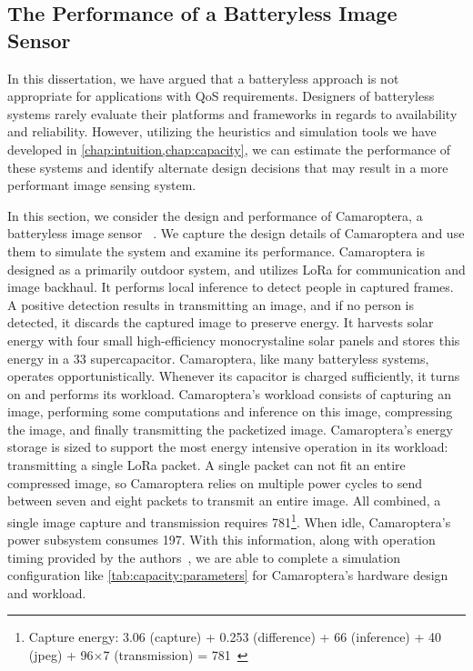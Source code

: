 \subsection{The Performance of a Batteryless Image Sensor}
In this dissertation, we have argued that a batteryless approach is not appropriate for applications with QoS requirements. Designers of batteryless systems rarely evaluate their platforms and frameworks in regards to availability and reliability. However, utilizing the heuristics and simulation tools we have developed in \cref{chap:intuition,chap:capacity}, we can estimate the performance of these systems and identify alternate design decisions that may result in a more performant image sensing system.

In this section, we consider the design and performance of Camaroptera, a batteryless image sensor
~\cite{nardello2019camaroptera,desai2022camaroptera}.
We capture the design details of Camaroptera and use them to simulate the system and examine its performance.
Camaroptera is designed as a primarily outdoor system, and utilizes LoRa for communication and image backhaul.
It performs local inference to detect people in captured frames. A positive detection results in transmitting an image, and if no person is detected, it discards the captured image to preserve energy. 
It harvests solar energy with four small high-efficiency monocrystaline solar panels and stores this energy in a 33\ssi{\milli\farad} supercapacitor.
Camaroptera, like many batteryless systems, operates opportunistically. 
Whenever its capacitor is charged sufficiently, it turns on and  performs its workload. 
Camaroptera's workload consists of capturing an image, performing some computations and inference on this image, compressing the image, and finally transmitting the packetized image. 
Camaroptera's energy storage is sized to support the most energy intensive operation in its workload: transmitting a single LoRa packet.
A single packet can not fit an entire compressed image, so Camaroptera relies on multiple power cycles to send between seven and eight packets to transmit an entire image.
All combined, a single image capture and transmission requires 781\ssi{\joule}\footnote{Capture energy: 3.06 (capture) + 0.253 (difference) + 66 (inference) + 40 (jpeg) + 96$\times$7 (transmission) = 781\ssi{\milli\joule}~\cite{desai2022camaroptera}}.
When idle, Camaroptera's power subsystem consumes 197\ssi{\micro\watt}.
With this information, along with operation timing provided by the authors~\cite{desai2022camaroptera}, we are able to complete a simulation configuration like \cref{tab:capacity:parameters} for Camaroptera's hardware design and workload.

